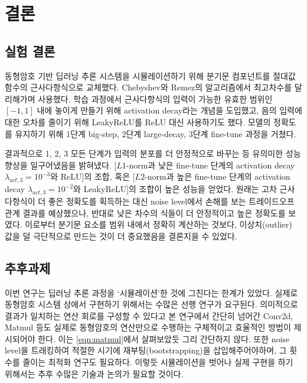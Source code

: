 \documentclass[a4paper, 11pt, chapterprefix=false]{report}
\begin{document}
\chapter{결론}

\section{실험 결론}

동형암호 기반 딥러닝 추론 시스템을 시뮬레이션하기 위해 분기문 컴포넌트를 절대값
함수의 근사다항식으로 교체했다. Chebyshev와 Remez의 알고리즘에서 최고차수를
달리해가며 사용했다. 학습 과정에서 근사다항식의 입력이 가능한 유효한 범위인
$[-1, 1]$ 내에 놓이게 만들기 위해 activation decay라는 개념을 도입했고, 음의
입력에 대한 오차를 줄이기 위해 LeakyReLU를 ReLU 대신 사용하기도 했다. 모델의
정확도를 유지하기 위해 1단계 big-step, 2단계 large-decay, 3단계 fine-tune 과정을
거쳤다.

결과적으로 1, 2, 3 모든 단계가 입력의 분포를 더 안정적으로 바꾸는 등 유의미한
성능 향상을 일구어냈음을 밝혀냈다. [$L1$-norm과 낮은 fine-tune 단계의 activation
decay $\lambda_{act,3}=10^{-3}$와 ReLU]의 조합, 혹은 [$L2$-norm과 높은 fine-tune
단계의 activation decay $\lambda_{act,3}=10^{-2}$와 LeakyReLU]의 조합이 높은
성능을 얻었다. 원래는 고차 근사 다항식이 더 좋은 정확도를 획득하는 대신 noise
level에서 손해를 보는 트레이드오프 관계 결과를 예상했으나, 반대로 낮은 차수의
식들이 더 안정적이고 높은 정확도를 보였다. 이로부터 분기문 요소를 범위 내에서
정확히 계산하는 것보다, 이상치(outlier) 값을 덜 극단적으로 만드는 것이 더
중요했음을 결론지을 수 있었다.

\section{추후과제}

이번 연구는 딥러닝 추론 과정을 `시뮬레이션'한 것에 그친다는 한계가 있었다.
실제로 동형암호 시스템 상에서 구현하기 위해서는 수많은 선행 연구가 요구된다.
의미적으로 결과가 일치하는 연산 회로를 구성할 수 있다고 본 연구에서 간단히
넘어간 Conv2d, Matmul 등도 실제로 동형암호의 연산만으로 수행하는 구체적이고
효율적인 방법이 제시되어야 한다. 이는 \autoref{eqn:matmul}에서 살펴보았듯 그리
간단하지 않다. 또한 noise level을 트래킹하여 적절한 시기에
재부팅(bootstrapping)을 삽입해주어야하며, 그 횟수를 줄이는 최적화 연구도
필요하다. 이렇듯 시뮬레이션을 벗어나 실제 구현을 하기 위해서는 추후 수많은
기술과 논의가 필요할 것이다.


\printbibliography[title=참고문헌]
\end{document}
